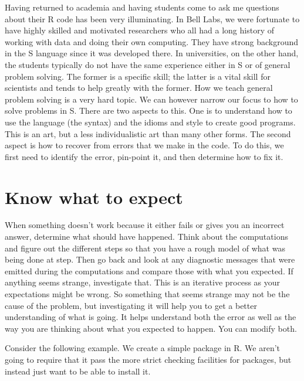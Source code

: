 Having returned to academia and having students come to ask me
questions about their R code has been very illuminating.  In Bell
Labs, we were fortunate to have highly skilled and motivated
researchers who all had a long history of working with data and doing
their own computing.  They have strong background in the S language
since it was developed there.  In universities, on the other hand, the
students typically do not have the same experience either in S or of
general problem solving.  The former is a specific skill; the latter
is a vital skill for scientists and tends to help greatly with the
former.  How we teach general problem solving is a very hard topic.
We can however narrow our focus to how to solve problems in S.  There
are two aspects to this.  One is to understand how to use the language
(the syntax) and the idioms and style to create good programs.  This
is an art, but a less individualistic art than many other forms.  The
second aspect is how to recover from errors that we make in the code.
To do this, we first need to identify the error, pin-point it, and
then determine how to fix it.


\section{Know what to expect}
When something doesn't work
because it either fails or gives you an incorrect
answer, determine what should have happened.
Think about the computations and
figure out the different steps so that
you have a rough model of what was being
done at step.
Then go back and look at any diagnostic
messages that were emitted during the computations
and compare those with what you expected.
If anything seems strange, investigate that.
This is an iterative process as your expectations
 might be wrong. So something that seems strange may not
be the cause of the problem, but investigating
it will help you to get a better understanding of
what is going.  It helps understand
both the error as well as the way you are thinking
about what you expected to happen.
You can modify both.


Consider the following example.  We create a simple package in R.  We
aren't going to require that it pass the more strict checking
facilities for packages, but instead just want to be able to install
it.

